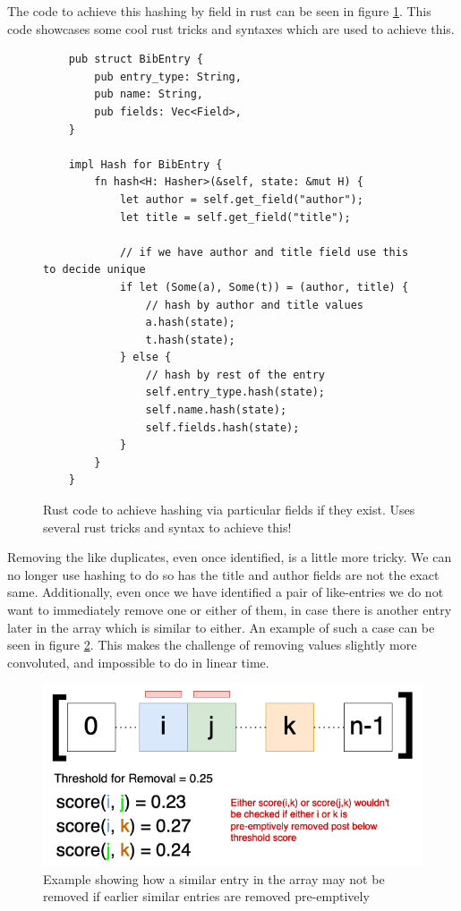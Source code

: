 \documentclass[a4paper,11pt]{article}
\begin{document}
The code to achieve this hashing by field in rust can be seen in figure \ref{fig:rustHashing}. This code showcases some cool rust tricks and syntaxes which are used to achieve this.

\begin{figure}
    \centering
    \begin{verbatim}
    pub struct BibEntry {
        pub entry_type: String,
        pub name: String,
        pub fields: Vec<Field>,
    }
    
    impl Hash for BibEntry {
        fn hash<H: Hasher>(&self, state: &mut H) {
            let author = self.get_field("author");
            let title = self.get_field("title");
    
            // if we have author and title field use this to decide unique
            if let (Some(a), Some(t)) = (author, title) {
                // hash by author and title values
                a.hash(state);
                t.hash(state);
            } else {
                // hash by rest of the entry
                self.entry_type.hash(state);
                self.name.hash(state);
                self.fields.hash(state);
            }
        }
    }
    \end{verbatim}
    \caption{Rust code to achieve hashing via particular fields if they exist. Uses several rust tricks and syntax to achieve this!}
    \label{fig:rustHashing}
\end{figure}

Removing the like duplicates, even once identified, is a little more tricky. We can no longer use hashing to do so has the title and author fields are not the exact same. Additionally, even once we have identified a pair of like-entries we do not want to immediately remove one or either of them, in case there is another entry later in the array which is similar to either. An example of such a case can be seen in figure \ref{fig:arraySimilarity}. This makes the challenge of removing values slightly more convoluted, and impossible to do in linear time.

\begin{figure}[H]
    \centering
    \includegraphics[width=0.6\linewidth]{diagrams/arraySimilarity.drawio.png}
    \caption{Example showing how a similar entry in the array may not be removed if earlier similar entries are removed pre-emptively}
    \label{fig:arraySimilarity}
\end{figure}
\end{document}
